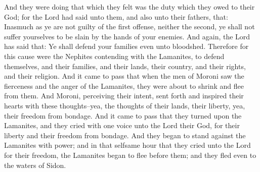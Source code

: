 \bverse \iffalse And they were doing that which they felt was the duty which they owed to their God; for the Lord had said unto them, and also unto their fathers, that: Inasmuch as ye are not guilty of the first offense, neither the second, ye shall not suffer yourselves to be slain by the hands of your enemies. \fi
And they were doing that which they felt was the duty which they owed to their God; for the Lord had said unto them, and also unto their fathers, that: Inasmuch as ye are not guilty of the first offense, neither the second, ye shall not suffer yourselves to be slain by the hands of your enemies.
\bverse \iffalse And again, the Lord has said that: Ye shall defend your families even unto bloodshed. Therefore for this cause were the Nephites contending with the Lamanites, to defend themselves, and their families, and their lands, their country, and their rights, and their religion. \fi
And again, the Lord has said that: Ye shall defend your families even unto bloodshed. Therefore for this cause were the Nephites contending with the Lamanites, to defend themselves, and their families, and their lands, their country, and their rights, and their religion.
\bverse \iffalse And it came to pass that when the men of Moroni saw the fierceness and the anger of the Lamanites, they were about to shrink and flee from them. And Moroni, perceiving their intent, sent forth and inspired their hearts with these thoughts--yea, the thoughts of their lands, their liberty, yea, their freedom from bondage. \fi
And it came to pass that when the men of Moroni saw the fierceness and the anger of the Lamanites, they were about to shrink and flee from them. And Moroni, perceiving their intent, sent forth and inspired their hearts with these thoughts--yea, the thoughts of their lands, their liberty, yea, their freedom from bondage.
\bverse \iffalse And it came to pass that they turned upon the Lamanites, and they cried with one voice unto the Lord their God, for their liberty and their freedom from bondage. \fi
And it came to pass that they turned upon the Lamanites, and they cried with one voice unto the Lord their God, for their liberty and their freedom from bondage.
\bverse \iffalse And they began to stand against the Lamanites with power; and in that selfsame hour that they cried unto the Lord for their freedom, the Lamanites began to flee before them; and they fled even to the waters of Sidon. \fi
And they began to stand against the Lamanites with power; and in that selfsame hour that they cried unto the Lord for their freedom, the Lamanites began to flee before them; and they fled even to the waters of Sidon.
